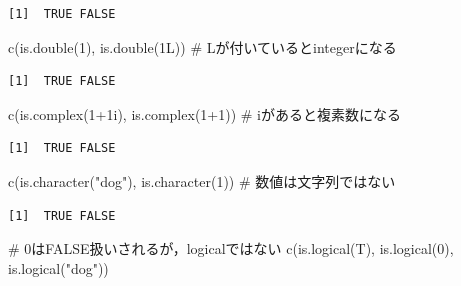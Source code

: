 \documentclass[
  letterpaper,
  DIV=11,
  numbers=noendperiod]{scrreprt}
\newenvironment{Shaded}{\begin{snugshade}}{\end{snugshade}}
\newcommand{\CommentTok}[1]{\textcolor[rgb]{0.37,0.37,0.37}{#1}}
\newcommand{\DecValTok}[1]{\textcolor[rgb]{0.68,0.00,0.00}{#1}}
\newcommand{\FunctionTok}[1]{\textcolor[rgb]{0.28,0.35,0.67}{#1}}
\newcommand{\NormalTok}[1]{\textcolor[rgb]{0.00,0.23,0.31}{#1}}
\newcommand{\SpecialCharTok}[1]{\textcolor[rgb]{0.37,0.37,0.37}{#1}}
\newcommand{\StringTok}[1]{\textcolor[rgb]{0.13,0.47,0.30}{#1}}
\begin{document}
\begin{verbatim}
[1]  TRUE FALSE
\end{verbatim}

\begin{Shaded}
\begin{Highlighting}[]
\FunctionTok{c}\NormalTok{(}\FunctionTok{is.double}\NormalTok{(}\DecValTok{1}\NormalTok{), }\FunctionTok{is.double}\NormalTok{(1L)) }\CommentTok{\# Lが付いているとintegerになる}
\end{Highlighting}
\end{Shaded}

\begin{verbatim}
[1]  TRUE FALSE
\end{verbatim}

\begin{Shaded}
\begin{Highlighting}[]
\FunctionTok{c}\NormalTok{(}\FunctionTok{is.complex}\NormalTok{(}\DecValTok{1}\SpecialCharTok{+}\NormalTok{1i), }\FunctionTok{is.complex}\NormalTok{(}\DecValTok{1}\SpecialCharTok{+}\DecValTok{1}\NormalTok{)) }\CommentTok{\# iがあると複素数になる}
\end{Highlighting}
\end{Shaded}

\begin{verbatim}
[1]  TRUE FALSE
\end{verbatim}

\begin{Shaded}
\begin{Highlighting}[]
\FunctionTok{c}\NormalTok{(}\FunctionTok{is.character}\NormalTok{(}\StringTok{"dog"}\NormalTok{), }\FunctionTok{is.character}\NormalTok{(}\DecValTok{1}\NormalTok{)) }\CommentTok{\# 数値は文字列ではない}
\end{Highlighting}
\end{Shaded}

\begin{verbatim}
[1]  TRUE FALSE
\end{verbatim}

\begin{Shaded}
\begin{Highlighting}[]
\CommentTok{\# 0はFALSE扱いされるが，logicalではない}
\FunctionTok{c}\NormalTok{(}\FunctionTok{is.logical}\NormalTok{(T), }\FunctionTok{is.logical}\NormalTok{(}\DecValTok{0}\NormalTok{), }\FunctionTok{is.logical}\NormalTok{(}\StringTok{"dog"}\NormalTok{)) }
\end{Highlighting}
\end{Shaded}
\end{document}

